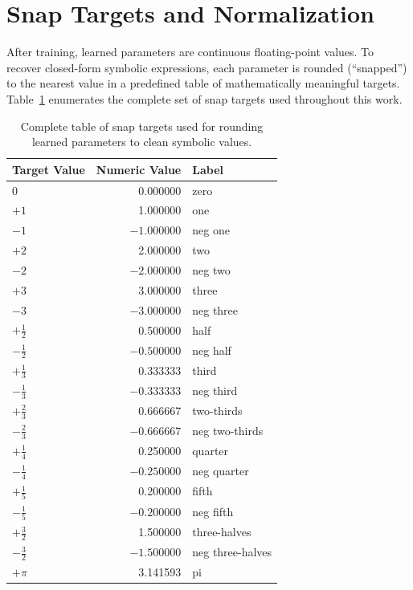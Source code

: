 \section{Snap Targets and Normalization}
\label{app:snap}

After training, learned parameters are continuous floating-point values.
To recover closed-form symbolic expressions, each parameter is rounded
(``snapped'') to the nearest value in a predefined table of
mathematically meaningful targets. Table~\ref{tab:snap-targets}
enumerates the complete set of snap targets used throughout this work.

\begin{table}[h]
\centering
\caption{Complete table of snap targets used for rounding learned parameters to clean symbolic values.}
\label{tab:snap-targets}
\begin{tabular}{lrl}
\toprule
\textbf{Target Value} & \textbf{Numeric Value} & \textbf{Label} \\
\midrule
$0$             &  0.000000 & zero \\
$+1$            &  1.000000 & one \\
$-1$            & $-1.000000$ & neg one \\
$+2$            &  2.000000 & two \\
$-2$            & $-2.000000$ & neg two \\
$+3$            &  3.000000 & three \\
$-3$            & $-3.000000$ & neg three \\
$+\tfrac{1}{2}$ &  0.500000 & half \\
$-\tfrac{1}{2}$ & $-0.500000$ & neg half \\
$+\tfrac{1}{3}$ &  0.333333 & third \\
$-\tfrac{1}{3}$ & $-0.333333$ & neg third \\
$+\tfrac{2}{3}$ &  0.666667 & two-thirds \\
$-\tfrac{2}{3}$ & $-0.666667$ & neg two-thirds \\
$+\tfrac{1}{4}$ &  0.250000 & quarter \\
$-\tfrac{1}{4}$ & $-0.250000$ & neg quarter \\
$+\tfrac{1}{5}$ &  0.200000 & fifth \\
$-\tfrac{1}{5}$ & $-0.200000$ & neg fifth \\
$+\tfrac{3}{2}$ &  1.500000 & three-halves \\
$-\tfrac{3}{2}$ & $-1.500000$ & neg three-halves \\
$+\pi$          &  3.141593 & pi \\

\end{tabular}
\end{table}
